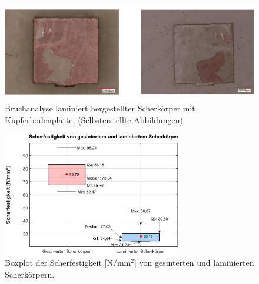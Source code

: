 \begin{figure}[H]
    \centering
    \includegraphics[scale=0.2]{Bilder/7s.png}
    \caption{Bruchanalyse laminiert hergestellter Scherkörper mit Kupferbodenplatte, (Selbsterstellte Abbildungen)}
    \label{lamWhats}
\end{figure}

\begin{figure}[H]
    \centering
    \includegraphics[width=0.7\textwidth]{Bilder/boxplot_final.eps}
    \caption{Boxplot der Scherfestigkeit {[}N/mm$^2${]} von gesinterten und laminierten Scherkörpern.}
    \label{fig:boxplot}
\end{figure}





